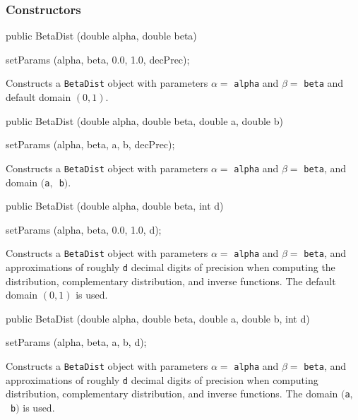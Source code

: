 \subsubsection* {Constructors}

\begin{code}

   public BetaDist (double alpha, double beta)\begin{hide} {
      setParams (alpha, beta, 0.0, 1.0, decPrec);
   }\end{hide}
\end{code}
  \begin{tabb}  Constructs a \texttt{BetaDist} object with parameters $\alpha =$
     \texttt{alpha} and $\beta =$ \texttt{beta} and default domain $(0,1)$.
  \end{tabb}
\begin{code}

   public BetaDist (double alpha, double beta, double a, double b)\begin{hide} {
      setParams (alpha, beta, a, b, decPrec);
   }\end{hide}
\end{code}
  \begin{tabb}  Constructs a \texttt{BetaDist} object with parameters $\alpha =$
     \texttt{alpha} and $\beta =$ \texttt{beta}, and domain $($\texttt{a}$,$~\texttt{b}$)$.
  \end{tabb}
\begin{code}

   public BetaDist (double alpha, double beta, int d)\begin{hide} {
      setParams (alpha, beta, 0.0, 1.0, d);
   }\end{hide}
\end{code}
\begin{tabb} Constructs a \texttt{BetaDist} object with parameters $\alpha = {}$
   \texttt{alpha} and $\beta = {}$ \texttt{beta}, and approximations of roughly \texttt{d}
   decimal digits of precision when computing the distribution,  complementary
   distribution, and inverse functions. The default domain $(0,1)$ is used.
\end{tabb}
\begin{code}

   public BetaDist (double alpha, double beta, double a, double b, int d)\begin{hide} {
      setParams (alpha, beta, a, b, d);
   }\end{hide}
\end{code}
\begin{tabb}
   Constructs a \texttt{BetaDist} object with parameters $\alpha = {}$ \texttt{alpha}
   and $\beta = {}$ \texttt{beta}, and approximations of roughly \texttt{d}
   decimal digits of precision when computing distribution, complementary
   distribution, and inverse functions.  The domain $($\texttt{a}$,$~\texttt{b}$)$
   is used.
\end{tabb}

